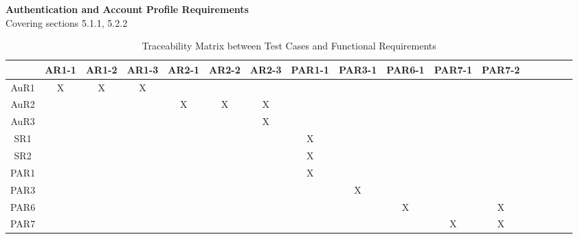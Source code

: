 \documentclass[12pt, titlepage]{article}
\begin{document}
\noindent \textbf{Authentication and Account Profile Requirements}\\
Covering sections 5.1.1, 5.2.2
\begin{table}[H]
    \tiny
    \centering
    \begin{tabular}{|c|c|c|c|c|c|c|c|c|c|c|c|c|c|c|c|c|}
        \hline
        &     AR1-1&AR1-2&AR1-3&AR2-1&AR2-2&AR2-3&PAR1-1&PAR3-1&PAR6-1&PAR7-1&PAR7-2\\ \hline
        AuR1 &    X&    X&    X&     &     &     &      &      &      &      &      \\ \hline
        AuR2 &     &     &     &    X&    X&    X&      &      &      &      &      \\ \hline
        AuR3 &     &     &     &     &     &    X&      &      &      &      &      \\ \hline
        SR1  &     &     &     &     &     &     &     X&      &      &      &      \\ \hline
        SR2  &     &     &     &     &     &     &     X&      &      &      &      \\ \hline
        PAR1 &     &     &     &     &     &     &     X&      &      &      &      \\ \hline
        PAR3 &     &     &     &     &     &     &      &     X&      &      &      \\ \hline
        PAR6 &     &     &     &     &     &     &      &      &     X&      &X     \\ \hline
        PAR7 &     &     &     &     &     &     &      &      &      &     X&X     \\ \hline
    \end{tabular}
    \caption{Traceability Matrix between Test Cases and Functional Requirements}
\end{table}
\end{document}
